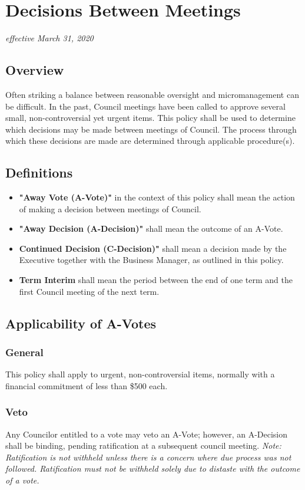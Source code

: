 \section{Decisions Between Meetings}
\emph{effective March 31, 2020}\\

\subsection{Overview}
Often striking a balance between reasonable oversight and micromanagement can be difficult. In
the past, Council meetings have been called to approve several small, non-controversial yet 
urgent items.  This policy shall be used to determine which decisions may be made between 
meetings of Council.  The process through which these decisions are made are determined through applicable procedure(s).

\subsection{Definitions}
\begin{itemize}
    \item \textbf{"Away Vote (A-Vote)"} in the context of this policy shall mean the action of making a decision between meetings of Council. 
    \item \textbf{"Away Decision (A-Decision)"} shall mean the outcome of an A-Vote.
    \item \textbf{Continued Decision (C-Decision)"} shall mean a decision made by the Executive together with the Business Manager, as outlined in this policy. 
    \item \textbf{Term Interim} shall mean the period between the end of one term and the first Council meeting of the next term.
\end{itemize}

\subsection{Applicability of A-Votes}

\subsubsection{General}
This policy shall apply to urgent, non-controversial items, normally with a financial commitment 
of less than \$500 each.

\subsubsection{Veto}
Any Councilor entitled to a vote may veto an A-Vote; however, an A-Decision shall be binding, 
pending ratification at a subsequent council meeting.
\textit{Note: Ratification is not withheld unless there is a concern where due process was not 
followed. Ratification must not be withheld solely due to distaste with the outcome of a vote.}

